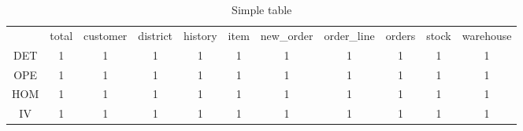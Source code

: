 


\begin{table}
\renewcommand{\arraystretch}{1.3}
\caption{Simple table}
\label{tab:example}
\centering
\begin{tabular}{|c|c|c|c|c|c|c|c|c|c|c|}
  \hline
&total & customer & district & history & item & new\_order & order\_line & orders & stock & warehouse   \\
DET & 1 & 1 & 1 & 1 & 1 & 1 & 1 & 1 & 1&1 \\  
OPE & 1 & 1 & 1 & 1 & 1 & 1 & 1 & 1 & 1&1 \\
HOM & 1 & 1 & 1 & 1 & 1 & 1 & 1 & 1 & 1&1 \\
IV & 1 & 1 & 1 & 1 & 1 & 1 & 1 & 1 & 1&1 \\
\hline
\end{tabular}
\end{table}